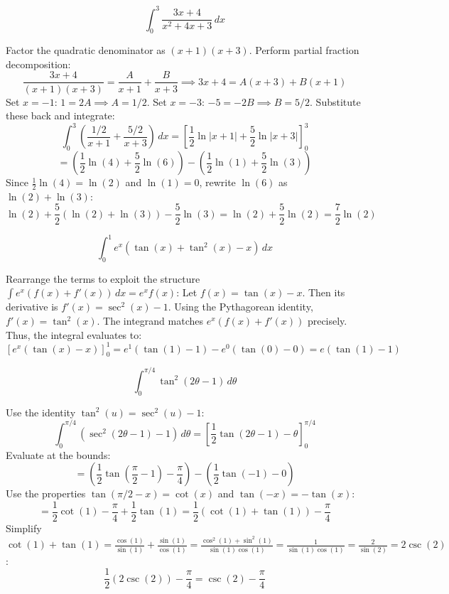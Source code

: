 \begin{questions}
    \question \[ \int_{0}^{3}\frac{3x+4}{x^{2}+4x+3} \,dx \]
    \begin{solution}
        Factor the quadratic denominator as $(x+1)(x+3)$. Perform partial fraction decomposition:
        \[ \frac{3x+4}{(x+1)(x+3)} = \frac{A}{x+1} + \frac{B}{x+3} \implies 3x+4 = A(x+3) + B(x+1) \]
        Set $x = -1$: $1 = 2A \implies A = 1/2$.
        Set $x = -3$: $-5 = -2B \implies B = 5/2$.
        Substitute these back and integrate:
        \[ \int_{0}^{3} \left( \frac{1/2}{x+1} + \frac{5/2}{x+3} \right) \,dx = \left[ \frac{1}{2}\ln|x+1| + \frac{5}{2}\ln|x+3| \right]_0^3 \]
        \[ = \left( \frac{1}{2}\ln(4) + \frac{5}{2}\ln(6) \right) - \left( \frac{1}{2}\ln(1) + \frac{5}{2}\ln(3) \right) \]
        Since $\frac{1}{2}\ln(4) = \ln(2)$ and $\ln(1) = 0$, rewrite $\ln(6)$ as $\ln(2) + \ln(3)$:
        \[ \ln(2) + \frac{5}{2}(\ln(2) + \ln(3)) - \frac{5}{2}\ln(3) = \ln(2) + \frac{5}{2}\ln(2) = \frac{7}{2}\ln(2) \]
    \end{solution}

    \question \[ \int_{0}^{1}e^{x}(\tan(x)+\tan^{2}(x)-x) \,dx \]
    \begin{solution}
        Rearrange the terms to exploit the structure $\int e^x (f(x) + f'(x)) \,dx = e^x f(x)$:
        Let $f(x) = \tan(x) - x$. 
        Then its derivative is $f'(x) = \sec^2(x) - 1$.
        Using the Pythagorean identity, $f'(x) = \tan^2(x)$. 
        The integrand matches $e^x(f(x) + f'(x))$ precisely. Thus, the integral evaluates to:
        \[ \left[ e^x (\tan(x) - x) \right]_0^1 = e^1(\tan(1) - 1) - e^0(\tan(0) - 0) = e(\tan(1) - 1) \]
    \end{solution}

    \question \[ \int_{0}^{\pi/4}\tan^{2}(2\theta-1) \,d\theta \]
    \begin{solution}
        Use the identity $\tan^2(u) = \sec^2(u) - 1$:
        \[ \int_{0}^{\pi/4} (\sec^2(2\theta-1) - 1) \,d\theta = \left[ \frac{1}{2}\tan(2\theta-1) - \theta \right]_0^{\pi/4} \]
        Evaluate at the bounds:
        \[ = \left( \frac{1}{2}\tan\left(\frac{\pi}{2}-1\right) - \frac{\pi}{4} \right) - \left( \frac{1}{2}\tan(-1) - 0 \right) \]
        Use the properties $\tan(\pi/2 - x) = \cot(x)$ and $\tan(-x) = -\tan(x)$:
        \[ = \frac{1}{2}\cot(1) - \frac{\pi}{4} + \frac{1}{2}\tan(1) = \frac{1}{2}(\cot(1) + \tan(1)) - \frac{\pi}{4} \]
        Simplify $\cot(1) + \tan(1) = \frac{\cos(1)}{\sin(1)} + \frac{\sin(1)}{\cos(1)} = \frac{\cos^2(1) + \sin^2(1)}{\sin(1)\cos(1)} = \frac{1}{\sin(1)\cos(1)} = \frac{2}{\sin(2)} = 2\csc(2)$:
        \[ \frac{1}{2}(2\csc(2)) - \frac{\pi}{4} = \csc(2) - \frac{\pi}{4} \]
    \end{solution}


\end{questions}
